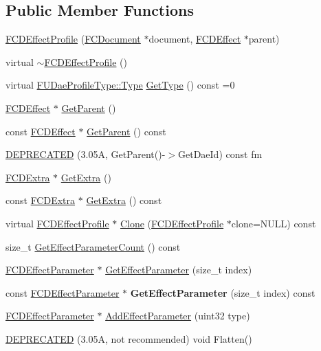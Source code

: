 \subsection*{Public Member Functions}
\begin{DoxyCompactItemize}
\item 
\hyperlink{classFCDEffectProfile_a9556428303b69f40a009c72de9b22cc9}{FCDEffectProfile} (\hyperlink{classFCDocument}{FCDocument} $\ast$document, \hyperlink{classFCDEffect}{FCDEffect} $\ast$parent)
\item 
virtual \hyperlink{classFCDEffectProfile_a2ad98f217369ae412db5df21d7cfc5c8}{$\sim$FCDEffectProfile} ()
\item 
virtual \hyperlink{namespaceFUDaeProfileType_ac10ea253a7a141708de2324a929f8a79}{FUDaeProfileType::Type} \hyperlink{classFCDEffectProfile_a48ae9db50d8cce2509d6a3d557a1b0a6}{GetType} () const =0
\item 
\hyperlink{classFCDEffect}{FCDEffect} $\ast$ \hyperlink{classFCDEffectProfile_a806741463f02e52835fcb6be20865513}{GetParent} ()
\item 
const \hyperlink{classFCDEffect}{FCDEffect} $\ast$ \hyperlink{classFCDEffectProfile_ab25cac5a4ca182eb96cac13b0044a77d}{GetParent} () const 
\item 
\hyperlink{classFCDEffectProfile_ad53800537042e1829dd607ac68c2630d}{DEPRECATED} (3.05A, GetParent()-\/$>$GetDaeId) const fm
\item 
\hyperlink{classFCDExtra}{FCDExtra} $\ast$ \hyperlink{classFCDEffectProfile_a9e0105d9bbe5590a771a4c5ea101fb64}{GetExtra} ()
\item 
const \hyperlink{classFCDExtra}{FCDExtra} $\ast$ \hyperlink{classFCDEffectProfile_a4adf36a1efe613e6816871e224a58f41}{GetExtra} () const 
\item 
virtual \hyperlink{classFCDEffectProfile}{FCDEffectProfile} $\ast$ \hyperlink{classFCDEffectProfile_ab7641c9671098f6966146798e61bb098}{Clone} (\hyperlink{classFCDEffectProfile}{FCDEffectProfile} $\ast$clone=NULL) const 
\item 
size\_\-t \hyperlink{classFCDEffectProfile_a1f3e9c38b6283cbdfb102e3393590746}{GetEffectParameterCount} () const 
\item 
\hyperlink{classFCDEffectParameter}{FCDEffectParameter} $\ast$ \hyperlink{classFCDEffectProfile_a91c0bff4f69ccf48e07809983167b34f}{GetEffectParameter} (size\_\-t index)
\item 
\hypertarget{classFCDEffectProfile_a4453f452c165f61024cba5a4958a3d35}{
const \hyperlink{classFCDEffectParameter}{FCDEffectParameter} $\ast$ {\bfseries GetEffectParameter} (size\_\-t index) const }
\label{classFCDEffectProfile_a4453f452c165f61024cba5a4958a3d35}

\item 
\hyperlink{classFCDEffectParameter}{FCDEffectParameter} $\ast$ \hyperlink{classFCDEffectProfile_a8b3be439e89e6abf8aab1ae61d27650c}{AddEffectParameter} (uint32 type)
\item 
\hyperlink{classFCDEffectProfile_aadc7e65fa145af53ec2bf47c6de550f2}{DEPRECATED} (3.05A, not recommended) void Flatten()
\end{DoxyCompactItemize}


